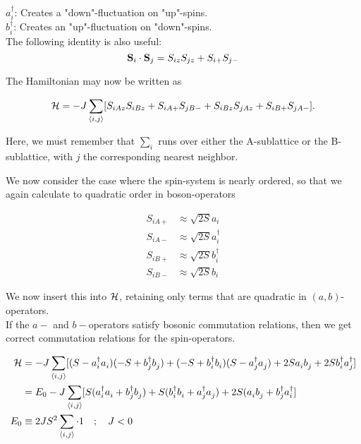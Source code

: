 $a_i^\dagger$: Creates a "down"-fluctuation on "up"-spins. \\
$b_i^\dagger$: Creates an "up"-fluctuation on "down"-spins. \\

The following identity is also useful:
\begin{equation}
    \vb{S}_i \cdot \vb{S}_j = S_{iz}S_{jz} + S_{i+}S_{j-}
\end{equation}

The Hamiltonian may now be written as

\begin{equation}
    \mathcal{H} = -J \sum_{\langle i, j \rangle} [S_{iAz}S_{iBz} + S_{iA+}S_{jB-} + S_{iBz}S_{jAz} + S_{iB+}S_{jA-}].
\end{equation}

\begin{tcolorbox}
    Here, we must remember that $\sum_i$ runs over either the A-sublattice or the B-sublattice, with $j$ the corresponding nearest neighbor.
\end{tcolorbox}

We now consider the case where the spin-system is nearly ordered, so that we again calculate to quadratic order in boson-operators

\begin{align}
    S_{iA+} &\approx \sqrt{2S}a_i \\
    S_{iA-} &\approx \sqrt{2S}a_i^\dagger \\
    S_{iB+} &\approx \sqrt{2S}b_i^\dagger \\
    S_{iB-} &\approx \sqrt{2S}b_i 
\end{align}

We now insert this into $\mathcal{H}$, retaining only terms that are quadratic in $(a, b)$-operators. \\

If the $a-$ and $b-$operators satisfy bosonic commutation relations, then we get correct commutation relations for the spin-operators.

\begin{align}
    \mathcal{H} &= -J \sum_{\langle i, j \rangle} [(S - a_i^\dagger a_i^{})(-S + b_j^\dagger b_j^{}) + (-S + b_i^\dagger b_i^{})(S - a_j^\dagger a_j^{}) + 2S a_i^{} b_j^{} + 2S b_i^\dagger a_j ^\dagger] \\
    &= E_0 - J\sum_{\langle i, j \rangle} [S(a_i^\dagger a_i^{} + b_j^\dagger b_j^{}) + S(b_i^\dagger b_i^{} + a_j^\dagger a_j^{}) + 2S (a_i^{} b_j^{} + b_j^\dagger a_i^\dagger] \\
    E_0 &\equiv 2JS^2 \sum_{\langle i, j \rangle}\cdot 1 \quad ; \quad J < 0
\end{align}

